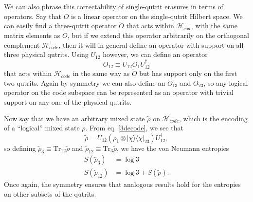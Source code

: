 \documentclass[12pt]{article}
\newcommand{\be}{\begin{equation}}
\newcommand{\ee}{\end{equation}}
\newcommand{\lan}{\langle}
\newcommand{\ran}{\rangle}
\newcommand{\Tr}{\mathrm{Tr}}
\newcommand{\wt}{\widetilde}
\newcommand{\Hc}{\mathcal{H}_{code}}
\begin{document}
We can also phrase this correctability of single-qutrit erasures in terms of operators. Say that $O$ is a linear operator on the single-qutrit Hilbert space.  We can easily find a three-qutrit operator $\wt{O}$ that acts within $\Hc$ with the same matrix elements as $O$, but if we extend this operator arbitrarily on the orthogonal complement $\Hc^\perp$, then it will in general define an operator with support on all three physical qutrits. Using $U_{12}$ however, we can define an operator
\be
O_{12}\equiv U_{12} O_1 U_{12}^\dagger
\ee   
that acts within $\Hc$ in the same way as $\wt{O}$ but has support only on the first two qutrits.  Again by symmetry we can also define an $O_{13}$ and $O_{23}$, so any logical operator on the code subspace can be represented as an operator with trivial support on any one of the physical qutrits.  

Now say that we have an arbitrary mixed state $\wt{\rho}$ on $\Hc$, which is the encoding of a ``logical'' mixed state $\rho$.  From eq. \eqref{3decode}, we see that 
\be
\wt{\rho}=U_{12}\left(\rho_1 \otimes |\chi\ran\lan\chi|_{23}\right) U_{12}^\dagger,
\ee
so defining $\wt{\rho}_3\equiv \Tr_{12}\wt{\rho}$ and $\wt{\rho}_{12}\equiv \Tr_3 \wt{\rho}$, we have the von Neumann entropies
\begin{align}\nonumber
S(\wt{\rho}_3)&=\log 3\\
S(\wt{\rho}_{12})&=\log 3+S(\wt{\rho}).\label{3ent}
\end{align}
Once again, the symmetry ensures that analogous results hold for the entropies on other subsets of the qutrits.
\end{document}
